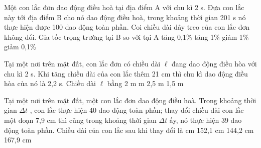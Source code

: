 \begin{ex}%
Một con lắc đơn dao động điều hoà tại địa điểm A với chu kì 2 s. Đưa con lắc này tới địa điểm B cho nó dao động điều hoà, trong khoảng thời gian 201 s nó thực hiện được 100 dao động toàn phần. Coi chiều dài dây treo của con lắc đơn không đổi. Gia tốc trọng trường tại B so với tại A
\choice
{tăng 0,1\%}
{tăng 1\%}
{\True giảm 1\%}
{giảm 0,1\%}
\end{ex} 
\begin{ex}%
Tại một nơi trên mặt đất, con lắc đơn có chiều dài $\ell$ đang dao động điều hòa với chu kì 2 s. Khi tăng chiều dài của con lắc thêm 21 cm thì chu kì dao động điều hòa của nó là 2,2 s. Chiều dài $\ell$ bằng
\choice
{2 m}
{ m}
{2,5 m}
{1,5 m}
\end{ex} 

\begin{ex}%
Tại một nơi trên mặt đất, một con lắc đơn dao động điều hoà. Trong khoảng thời gian  $\Delta t$ , con lắc thực hiện 40 dao động toàn phần; thay đổi chiều dài con lắc một đoạn 7,9 cm thì cũng trong khoảng thời gian  $\Delta t$  ấy, nó thực hiện 39 dao động toàn phần. Chiều dài của con lắc sau khi thay đổi là
\choice
{ cm}
{152,1 cm}
{144,2 cm}
{167,9 cm}
\end{ex} 


